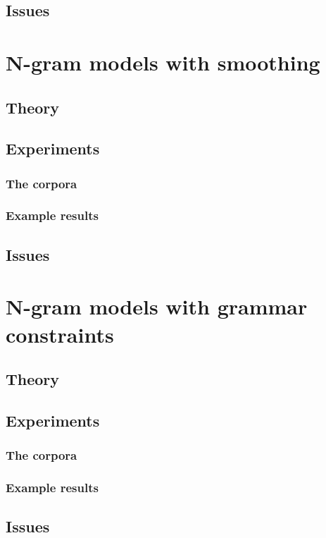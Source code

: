 \documentclass[a4paper,12pt]{article}
\begin{document}
\subsection{Issues}

\section{N-gram models with smoothing}
\label{sec:ngramsmoothing}

\subsection{Theory}
\subsection{Experiments}
\subsubsection{The corpora}
\subsubsection{Example results}
\subsection{Issues}

\section{N-gram models with grammar constraints}
\label{sec:ngramgrammar}

\subsection{Theory}
\subsection{Experiments}
\subsubsection{The corpora}
\subsubsection{Example results}
\subsection{Issues}
\end{document}

